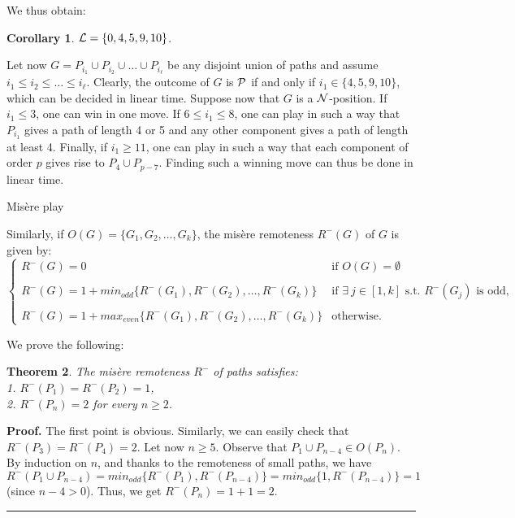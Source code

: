 \documentclass[11pt]{article}
\newcommand{\centre}[1]{\begin{center}#1\end{center}}
\newcommand{\NN}{{\cal N}}
\newcommand{\PP}{{\cal P}}
\newcommand{\LL}{{\cal L}}
\newtheorem{theorem}{Theorem}
\newtheorem{corollary}[theorem]{Corollary}
\newcommand\qed{\mbox{}\hfill\rule{0.5em}{0.809em}\par\vskip 5mm}
\newenvironment{proof}[0]{\noindent\textbf{Proof.}}{\qed}
\begin{document}
We thus obtain:

\begin{corollary}
$\LL=\{0,4,5,9,10\}$.
\end{corollary}

Let now $G=P_{i_1}\cup P_{i_2}\cup\dots\cup P_{i_\ell}$ be any disjoint union
of paths and assume $i_1\le i_2\le\dots\le i_\ell$.
Clearly, the outcome of $G$ is $\PP$ if and only
if $i_1\in\{4,5,9,10\}$, which can be decided in linear time. 
Suppose now that $G$ is a $\NN$-position.
If $i_1\le 3$, one can win in one move.
If $6\le i_1\le 8$, one can play in such a way that $P_{i_1}$ gives a
path of length 4 or 5 and any other component gives a path of length
at least 4.
Finally, if $i_1\ge 11$, one can play in such a way that each component 
of order $p$ gives rise to $P_4\cup P_{p-7}$.
Finding such a winning move can thus be done in linear time.


\vskip 4mm

\centre{{\sc Mis\`ere play}}

\noindent
Similarly, if $O(G)=\{G_1,G_2,\dots,G_k\}$, the mis\`ere remoteness $R^-(G)$
of $G$ is given by:
$$\left\{\begin{array}{ll}
 R^-(G)=0 & \mbox{if\ } O(G)=\emptyset \\
 \\
 R^-(G)=1+min_{odd}\{R^-(G_1),R^-(G_2),\dots,R^-(G_k)\} &
    \mbox{if $\exists\ j\in[1,k]$ s.t. $R^-(G_j)$ is odd,}\\
    \\
 R^-(G)=1+max_{even}\{R^-(G_1),R^-(G_2),\dots,R^-(G_k)\} &
   \mbox{otherwise.}
\end{array}
\right.$$

We prove the following:

\begin{theorem}
The mis\`ere remoteness $R^-$ of paths satisfies:\\
1. $R^-(P_1)=R^-(P_2)=1$, \\
2. $R^-(P_n)=2$ for every $n\ge 2$.
\end{theorem}

\begin{proof}
The first point is obvious. Similarly, we can easily check that $R^-(P_3)=R^-(P_4)=2$.
Let now $n\geq 5$. 
Observe that $P_1\cup P_{n-4}\in O(P_n)$. 
By induction on $n$, and thanks to the remoteness of small paths, we have
$R^-(P_1\cup P_{n-4})=min_{odd}\{ R^-(P_1),R^-(P_{n-4})\}=
min_{odd}\{1,R^-(P_{n-4})\}=1$ (since $n-4>0$). 
Thus, we get $R^-(P_n)=1+1=2$.
\end{proof}
\end{document}
